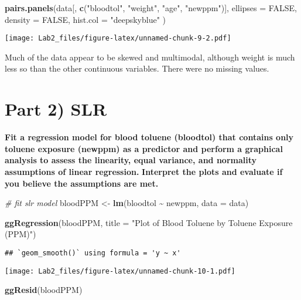 \documentclass[
]{article}
\newenvironment{Shaded}{\begin{snugshade}}{\end{snugshade}}
\newcommand{\AttributeTok}[1]{\textcolor[rgb]{0.13,0.29,0.53}{#1}}
\newcommand{\CommentTok}[1]{\textcolor[rgb]{0.56,0.35,0.01}{\textit{#1}}}
\newcommand{\ConstantTok}[1]{\textcolor[rgb]{0.56,0.35,0.01}{#1}}
\newcommand{\FunctionTok}[1]{\textcolor[rgb]{0.13,0.29,0.53}{\textbf{#1}}}
\newcommand{\NormalTok}[1]{#1}
\newcommand{\OtherTok}[1]{\textcolor[rgb]{0.56,0.35,0.01}{#1}}
\newcommand{\SpecialCharTok}[1]{\textcolor[rgb]{0.81,0.36,0.00}{\textbf{#1}}}
\newcommand{\StringTok}[1]{\textcolor[rgb]{0.31,0.60,0.02}{#1}}
\begin{document}
\begin{Shaded}
\begin{Highlighting}[]
\FunctionTok{pairs.panels}\NormalTok{(data[, }\FunctionTok{c}\NormalTok{(}\StringTok{"bloodtol"}\NormalTok{, }\StringTok{"weight"}\NormalTok{, }\StringTok{"age"}\NormalTok{, }\StringTok{"newppm"}\NormalTok{)],}
  \AttributeTok{ellipses =} \ConstantTok{FALSE}\NormalTok{, }\AttributeTok{density =} \ConstantTok{FALSE}\NormalTok{, }\AttributeTok{hist.col =} \StringTok{"deepskyblue"}
\NormalTok{)}
\end{Highlighting}
\end{Shaded}

\texttt{[image: Lab2\_files/figure-latex/unnamed-chunk-9-2.pdf]}

Much of the data appear to be skewed and multimodal, although weight is
much less so than the other continuous variables. There were no missing
values.

\section{Part 2) SLR}\label{part-2-slr}

\textbf{Fit a regression model for blood toluene (bloodtol) that
contains only toluene exposure (newppm) as a predictor and perform a
graphical analysis to assess the linearity, equal variance, and
normality assumptions of linear regression.} \textbf{Interpret the plots
and evaluate if you believe the assumptions are met.}

\begin{Shaded}
\begin{Highlighting}[]
\CommentTok{\# fit slr model}
\NormalTok{bloodPPM }\OtherTok{\textless{}{-}} \FunctionTok{lm}\NormalTok{(bloodtol }\SpecialCharTok{\textasciitilde{}}\NormalTok{ newppm, }\AttributeTok{data =}\NormalTok{ data)}

\FunctionTok{ggRegression}\NormalTok{(bloodPPM, }\AttributeTok{title =} \StringTok{"Plot of Blood Toluene by Toluene Exposure (PPM)"}\NormalTok{)}
\end{Highlighting}
\end{Shaded}

\begin{verbatim}
## `geom_smooth()` using formula = 'y ~ x'
\end{verbatim}

\texttt{[image: Lab2\_files/figure-latex/unnamed-chunk-10-1.pdf]}

\begin{Shaded}
\begin{Highlighting}[]
\FunctionTok{ggResid}\NormalTok{(bloodPPM)}
\end{Highlighting}
\end{Shaded}
\end{document}
